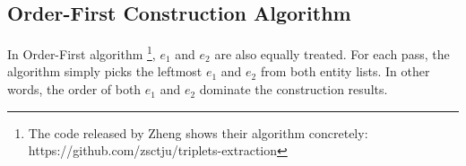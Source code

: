 
%  
%  

\subsection*{Order-First Construction Algorithm}
In Order-First algorithm
\footnote{The code released by Zheng shows their algorithm concretely:
https://github.com/zsctju/triplets-extraction},
$e_1$ and $e_2$ are also equally treated.
For each pass, the algorithm simply picks the leftmost $e_1$ and $e_2$ from both entity lists.
In other words, the order of both $e_1$ and $e_2$ dominate the construction results.


%    
%  




